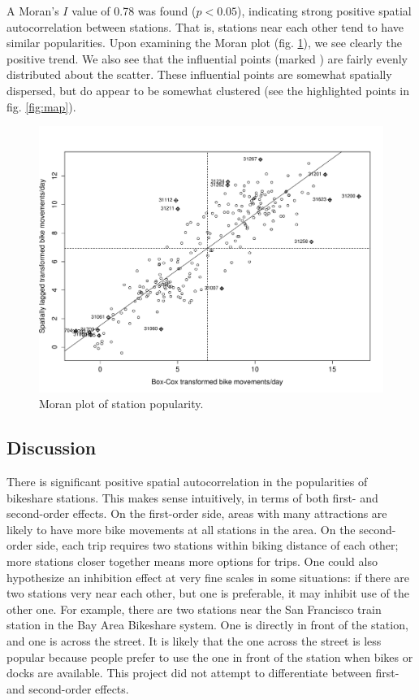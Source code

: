 \documentclass[letterpaper,11pt]{article}
\begin{document}
A Moran's $I$ value of 0.78 was found ($p < 0.05$), indicating strong
positive spatial autocorrelation between stations. That is, stations
near each other tend to have similar popularities. Upon examining the
Moran plot (fig. \ref{fig:moran}), we see clearly the positive
trend. We also see that the influential points (marked
\rlap{\tiny{+}}{$\diamond$}) are fairly evenly distributed about the
scatter. These influential points are somewhat spatially dispersed,
but do appear to be somewhat clustered (see the highlighted points in
fig. \ref{fig:map}).

\begin{figure}[t]
  \includegraphics[width=\textwidth]{moran_plot.pdf}
  \caption{\label{fig:moran} Moran plot of station popularity.}
\end{figure}



\subsection{Discussion}

There is significant positive spatial autocorrelation in the
popularities of bikeshare stations. This makes sense intuitively, in
terms of both first- and second-order effects. On the first-order
side, areas with many attractions are likely to have more bike
movements at all stations in the area. On the second-order side, each
trip requires two stations within biking distance of each other; more
stations closer together means more options for trips. One could also
hypothesize an inhibition effect at very fine scales in some
situations: if there are two stations very near each other, but one is
preferable, it may inhibit use of the other one. For example, there
are two stations near the San Francisco train station in the Bay Area
Bikeshare system. One is directly in front of the station, and one is
across the street. It is likely that the one across the street is less
popular because people prefer to use the one in front of the station
when bikes or docks are available. This project did not attempt to
differentiate between first- and second-order effects.
\end{document}
